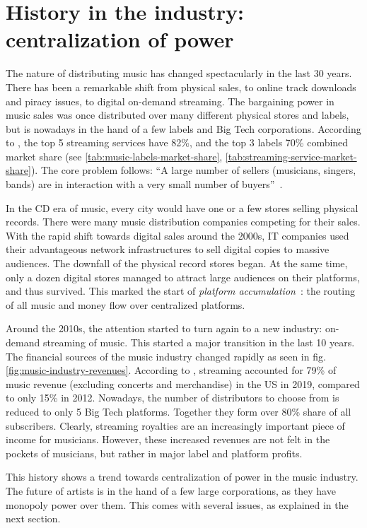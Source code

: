 \section{History in the industry: centralization of power}
The nature of distributing music has changed spectacularly in the last 30 years. There has been a remarkable shift from physical sales, to online track downloads and piracy issues, to digital on-demand streaming. The bargaining power in music sales was once distributed over many different physical stores and labels, but is nowadays in the hand of a few labels and Big Tech corporations. According to \cite{midiamarketshare2020}, the top 5 streaming services have 82\%, and the top 3 labels 70\% combined market share (see \ref{tab:music-labels-market-share}, \ref{tab:streaming-service-market-share}). The core problem follows: ``A large number of sellers (musicians, singers, bands) are in interaction with a very small number of buyers''~\citep{rayna2009monometapoly}.

In the CD era of music, every city would have one or a few stores selling physical records. There were many music distribution companies competing for their sales. With the rapid shift towards digital sales around the 2000s, IT companies used their advantageous network infrastructures to sell digital copies to massive audiences. The downfall of the physical record stores began. At the same time, only a dozen digital stores managed to attract large audiences on their platforms, and thus survived. This marked the start of \textit{platform accumulation}~\citep{meier2019rising}: the routing of all music and money flow over centralized platforms.

Around the 2010s, the attention started to turn again to a new industry: on-demand streaming of music. This started a major transition in the last 10 years. The financial sources of the music industry changed rapidly as seen in fig. \ref{fig:music-industry-revenues}. According to \cite{friedlander2020mid}, streaming accounted for 79\% of music revenue (excluding concerts and merchandise) in the US in 2019, compared to only 15\% in 2012. Nowadays, the number of distributors to choose from is reduced to only 5 Big Tech platforms. Together they form over 80\% share of all subscribers. Clearly, streaming royalties are an increasingly important piece of income for musicians. However, these increased revenues are not felt in the pockets of musicians, but rather in major label and platform profits.

This history shows a trend towards centralization of power in the music industry. The future of artists is in the hand of a few large corporations, as they have monopoly power over them. This comes with several issues, as explained in the next section.

